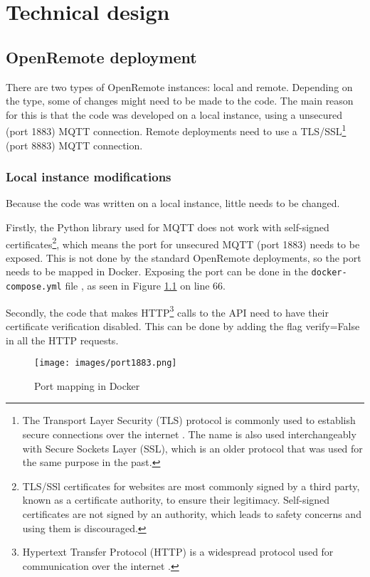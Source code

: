 \chapter{Technical design} \label{chap:tech_design}


\section{OpenRemote deployment}
There are two types of OpenRemote instances: local and remote. Depending on the type, some of changes might need to be made to the code. The main reason for this is that the code was developed on a local instance, using a unsecured (port 1883) MQTT connection. Remote deployments need to use a TLS/SSL\footnote{The Transport Layer Security (TLS) protocol is commonly used to establish secure connections over the internet \cite{wiki-tls} . The name is also used interchangeably with Secure Sockets Layer (SSL), which is an older protocol that was used for the same purpose in the past.} (port 8883) MQTT connection. 

\subsection{Local instance modifications}
Because the code was written on a local instance, little needs to be changed. 

Firstly, the Python library used for MQTT does not work with self-signed certificates\footnote{TLS/SSl certificates \cite{wiki-tls} for websites are most commonly signed by a third party, known as a certificate authority, to ensure their legitimacy. Self-signed certificates are not signed by an authority, which leads to safety concerns and using them is discouraged.}, which means the port for unsecured MQTT (port 1883) needs to be exposed. This is not done by the standard OpenRemote deployments, so the port needs to be mapped in Docker. Exposing the port can be done in the \lstinline|docker-compose.yml| file , as seen in Figure \ref{fig:port1883} on line 66.

Secondly, the code that makes HTTP\footnote{Hypertext Transfer Protocol (HTTP) is a widespread protocol used for communication over the internet \cite{wiki-http}.} calls to the API need to have their certificate verification disabled. This can be done by adding the flag verify=False in all the HTTP requests.

\begin{figure}[ht]
    \centering
    \texttt{[image: images/port1883.png]}
    \caption{Port mapping in Docker}
    \label{fig:port1883}
\end{figure}

